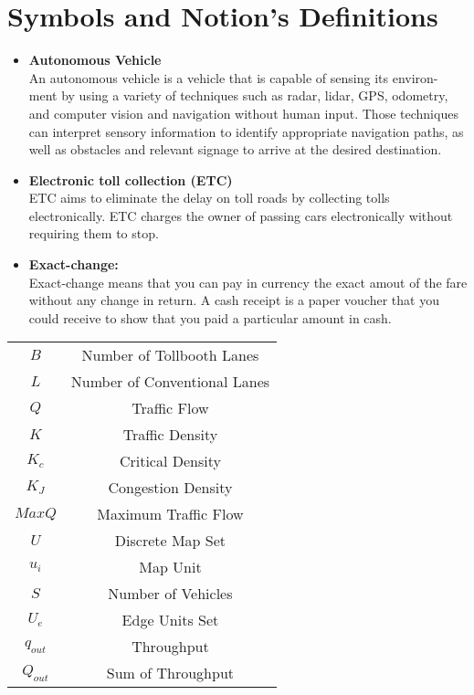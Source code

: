 \documentclass{mcmthesis}
\begin{document}
\section{Symbols and Notion's Definitions}
	\begin{itemize}
		\item \textbf{Autonomous Vehicle}\\An autonomous vehicle is a vehicle that is capable of sensing its environ- ment by using a variety of techniques such as radar, lidar, GPS, odometry, and computer vision and navigation without human input. Those techniques can interpret sensory information to identify appropriate navigation paths, as well as obstacles and relevant signage to arrive at the desired destination\cite{wiki:autonomous}.
		\item \textbf{Electronic toll collection (ETC)}\\ ETC aims to eliminate the delay on toll roads by collecting tolls electronically. ETC charges the owner of passing cars electronically without requiring them to stop\cite{wiki:electronictollcollection}.
		\item \textbf{Exact-change:}\\Exact-change means that you can pay in currency the exact amout of the fare without any change in return. A cash receipt is a paper voucher that you could receive to show that you paid a particular amount in cash.
	\end{itemize}
	\begin{tabular}{cc}
		\toprule
		\makebox[0.4\textwidth][c]{Symbols}	&  \makebox[0.5\textwidth][c]{Definitions} \\ \hline
		$B$	&	Number of Tollbooth Lanes\\
		$L$	&	Number of Conventional Lanes\\
		$Q$	&	Traffic Flow\\
		$K$	&	Traffic Density\\
		$K_c$	&	Critical Density\\
		$K_J$	&	Congestion Density \\
		$MaxQ$	&	Maximum Traffic Flow \\
		$U$			&	Discrete Map Set \\
		$u_i$		&	Map Unit \\
		$S$			&	Number of Vehicles \\
		$U_e$	&	Edge Units Set \\
		$q_{out}$	&	Throughput \\
		$Q_{out}$	& 	Sum of Throughput\\
		\bottomrule
	\end{tabular} 
\end{document}

